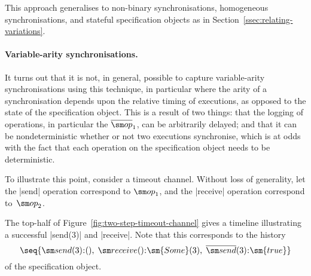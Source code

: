 This approach generalises to non-binary synchronisations, homogeneous
synchronisations, and stateful specification objects as in
Section~\ref{ssec:relating-variations}.




\paragraph{Variable-arity synchronisations.}

It turns out that it is not, in general, possible to capture variable-arity
synchronisations using this technique, in particular where the arity of a
synchronisation depends upon the relative timing of executions, as opposed to
the state of the specification object.  This is a result of two things: that
the logging of operations, in particular the $\overline{\op}_1$, can be
arbitrarily delayed; and that it can be nondeterministic whether or not two
executions synchronise, which is at odds with the fact that each operation on
the specification object needs to be deterministic.

To illustrate this point, consider a timeout channel.  Without loss of
generality, let the |send| operation correspond to $\op_1$, and the
|receive| operation correspond to~$\op_2$.

The top-half of Figure~\ref{fig:two-step-timeout-channel} gives a
timeline illustrating a successful |send(3)| and |receive|.  Note that this
corresponds to the history
\[
\seq{ \send(3)\::(),\; \receive()\::\sm{Some}(3),\; 
  \overline{\send}(3)\::\sm{true} }
\]
of the specification object.


